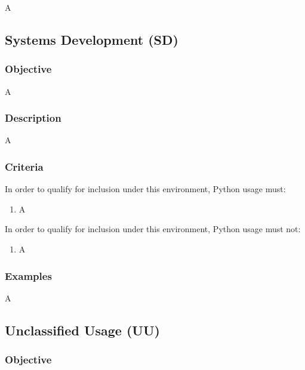 			A


	\subsection{Systems Development (SD)}

		\subsubsection{Objective}

			A

		\subsubsection{Description}

			A

		\subsubsection{Criteria}

			In order to qualify for inclusion under this environment, Python usage must:

			\begin{enumerate}
        		\item A
        	\end{enumerate}

			In order to qualify for inclusion under this environment, Python usage must not:

			\begin{enumerate}
        		\item A
        	\end{enumerate}

		\subsubsection{Examples}

			A


	\subsection{Unclassified Usage (UU)}

		\subsubsection{Objective}

